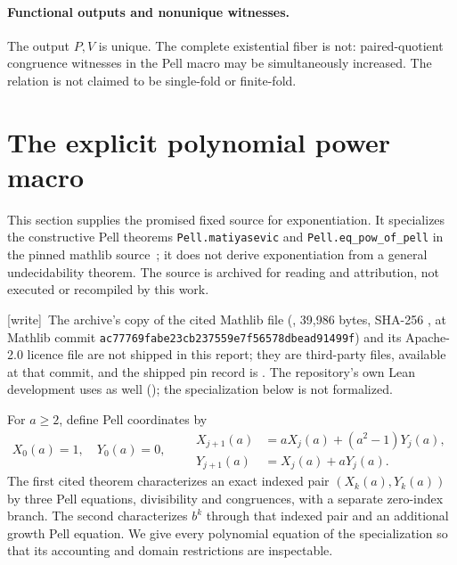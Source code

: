 \documentclass[11pt,letterpaper]{article}
\theoremstyle{definition}\newtheorem{definition}[theorem]{Definition}
\theoremstyle{remark}\newtheorem{remark}[theorem]{Remark}
\newcommand{\codeu}[1]{\nolinkurl{#1}}
\newcommand{\wtag}{\textup{[write]}}
\begin{document}
\paragraph{Functional outputs and nonunique witnesses.}
The output $P,V$ is unique. The complete existential fiber is not: paired-quotient congruence witnesses in the Pell macro may be simultaneously increased. The relation is not claimed to be single-fold or finite-fold.

\section{The explicit polynomial power macro}\label{ptr:ai:sec:pell}
This section supplies the promised fixed source for exponentiation. It specializes the constructive Pell theorems \codeu{Pell.matiyasevic} and \codeu{Pell.eq_pow_of_pell} in the pinned mathlib source~\cite{ptr:ai:pell}; it does not derive exponentiation from a general undecidability theorem. The source is archived for reading and attribution, not executed or recompiled by this work.

{\small\wtag\ The archive's copy of the cited Mathlib file
(, 39,986 bytes, SHA-256
, at
Mathlib commit \texttt{ac77769fabe23cb237559e7f56578dbead91499f}) and its
Apache-2.0 licence file are not shipped in this report; they are third-party
files, available at that commit, and the shipped pin record is
.
The repository's own Lean development uses  as well
();
the specialization below is not formalized.\par}

For $a\ge2$, define Pell coordinates by
\[
 X_0(a)=1,\quad Y_0(a)=0,
 \qquad
 \begin{aligned}
 X_{j+1}(a)&=aX_j(a)+(a^2-1)Y_j(a),\\
 Y_{j+1}(a)&=X_j(a)+aY_j(a).
 \end{aligned}
\]
The first cited theorem characterizes an exact indexed pair $(X_k(a),Y_k(a))$ by three Pell equations, divisibility and congruences, with a separate zero-index branch. The second characterizes $b^k$ through that indexed pair and an additional growth Pell equation. We give every polynomial equation of the specialization so that its accounting and domain restrictions are inspectable.
\end{document}
